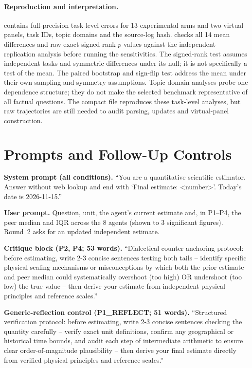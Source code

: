 \documentclass[10pt]{article}
\theoremstyle{manuscript}\newtheorem{proposition}{Proposition}
\begin{document}
\paragraph{Reproduction and interpretation.}  contains full-precision task-level errors for 13 experimental arms and two virtual panels, task IDs, topic domains and the source-log hash.  checks all 14 mean differences and raw exact signed-rank $p$-values against the independent replication analysis before running the sensitivities. The signed-rank test assumes independent tasks and symmetric differences under its null; it is not specifically a test of the mean. The paired bootstrap and sign-flip test address the mean under their own sampling and symmetry assumptions. Topic-domain analyses probe one dependence structure; they do not make the selected benchmark representative of all factual questions. The compact file reproduces these task-level analyses, but raw trajectories are still needed to audit parsing, updates and virtual-panel construction.

\FloatBarrier
{}
\section{Prompts and Follow-Up Controls}\label{app:prompts}
\textbf{System prompt (all conditions).} ``You are a quantitative scientific estimator. Answer without web lookup and end with `Final estimate: \textless number\textgreater'. Today's date is 2026-11-15.''

\textbf{User prompt.} Question, unit, the agent's current estimate and, in P1--P4, the peer median and IQR across the 8 agents (shown to 3 significant figures). Round~2 asks for an updated independent estimate.

\textbf{Critique block (P2, P4; 53 words).} ``Dialectical counter-anchoring protocol: before estimating, write 2-3 concise sentences testing both tails -- identify specific physical scaling mechanisms or misconceptions by which both the prior estimate and peer median could systematically overshoot (too high) OR undershoot (too low) the true value -- then derive your estimate from independent physical principles and reference scales.''

\textbf{Generic-reflection control (P1\_REFLECT; 51 words).} ``Structured verification protocol: before estimating, write 2-3 concise sentences checking the quantity carefully -- verify exact unit definitions, confirm any geographical or historical time bounds, and audit each step of intermediate arithmetic to ensure clear order-of-magnitude plausibility -- then derive your final estimate directly from verified physical principles and reference scales.''
\end{document}
